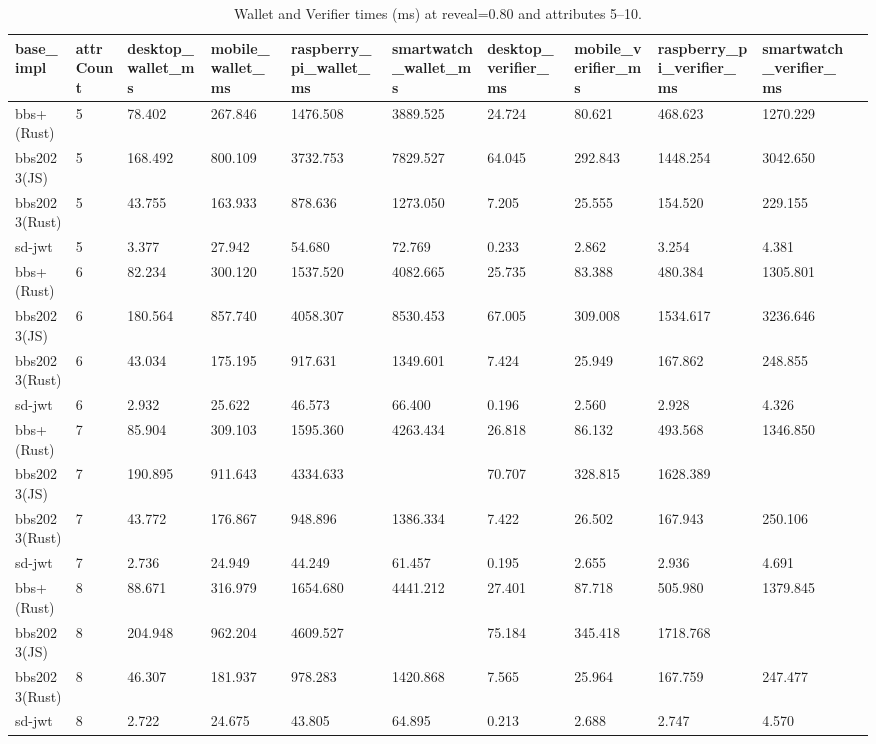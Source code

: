 \begin{table}[t]
\centering
\caption{Wallet and Verifier times (ms) at reveal=0.80 and attributes 5--10.}
\label{tab:times-filtered}
\begin{tabular}{lllllllllll}\toprule
base\_impl & attrCount & desktop\_wallet\_ms & mobile\_wallet\_ms & raspberry\_pi\_wallet\_ms & smartwatch\_wallet\_ms & desktop\_verifier\_ms & mobile\_verifier\_ms & raspberry\_pi\_verifier\_ms & smartwatch\_verifier\_ms \\\midrule
bbs+(Rust) & 5 & 78.402 & 267.846 & 1476.508 & 3889.525 & 24.724 & 80.621 & 468.623 & 1270.229 \\
bbs2023(JS) & 5 & 168.492 & 800.109 & 3732.753 & 7829.527 & 64.045 & 292.843 & 1448.254 & 3042.650 \\
bbs2023(Rust) & 5 & 43.755 & 163.933 & 878.636 & 1273.050 & 7.205 & 25.555 & 154.520 & 229.155 \\
sd-jwt & 5 & 3.377 & 27.942 & 54.680 & 72.769 & 0.233 & 2.862 & 3.254 & 4.381 \\
bbs+(Rust) & 6 & 82.234 & 300.120 & 1537.520 & 4082.665 & 25.735 & 83.388 & 480.384 & 1305.801 \\
bbs2023(JS) & 6 & 180.564 & 857.740 & 4058.307 & 8530.453 & 67.005 & 309.008 & 1534.617 & 3236.646 \\
bbs2023(Rust) & 6 & 43.034 & 175.195 & 917.631 & 1349.601 & 7.424 & 25.949 & 167.862 & 248.855 \\
sd-jwt & 6 & 2.932 & 25.622 & 46.573 & 66.400 & 0.196 & 2.560 & 2.928 & 4.326 \\
bbs+(Rust) & 7 & 85.904 & 309.103 & 1595.360 & 4263.434 & 26.818 & 86.132 & 493.568 & 1346.850 \\
bbs2023(JS) & 7 & 190.895 & 911.643 & 4334.633 &  & 70.707 & 328.815 & 1628.389 &  \\
bbs2023(Rust) & 7 & 43.772 & 176.867 & 948.896 & 1386.334 & 7.422 & 26.502 & 167.943 & 250.106 \\
sd-jwt & 7 & 2.736 & 24.949 & 44.249 & 61.457 & 0.195 & 2.655 & 2.936 & 4.691 \\
bbs+(Rust) & 8 & 88.671 & 316.979 & 1654.680 & 4441.212 & 27.401 & 87.718 & 505.980 & 1379.845 \\
bbs2023(JS) & 8 & 204.948 & 962.204 & 4609.527 &  & 75.184 & 345.418 & 1718.768 &  \\
bbs2023(Rust) & 8 & 46.307 & 181.937 & 978.283 & 1420.868 & 7.565 & 25.964 & 167.759 & 247.477 \\
sd-jwt & 8 & 2.722 & 24.675 & 43.805 & 64.895 & 0.213 & 2.688 & 2.747 & 4.570 \\

\end{tabular}
\end{table}
